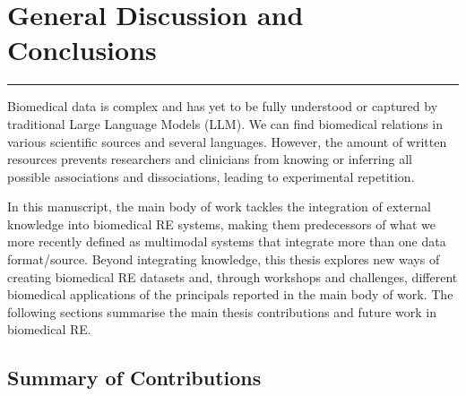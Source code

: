 \hypertarget{8}{}


\chapter[General Discussion and Conclusions]
{\huge General Discussion and Conclusions}

\vspace{-1.6cm}

\begingroup
\color{black}
\par\noindent\rule{\textwidth}{0.4pt}
\endgroup


Biomedical data is complex and has yet to be fully understood or captured by traditional Large Language Models (LLM). We can find biomedical relations in various scientific sources and several languages. However, the amount of written resources prevents researchers and clinicians from knowing or inferring all possible associations and dissociations, leading to experimental repetition. 

In this manuscript, the main body of work tackles the integration of external knowledge into biomedical RE systems, making them predecessors of what we more recently defined as multimodal systems that integrate more than one data format/source. Beyond integrating knowledge, this thesis explores new ways of creating biomedical RE datasets and, through workshops and challenges, different biomedical applications of the principals reported in the main body of work. The following sections summarise the main thesis contributions and future work in biomedical RE. 

\section{Summary of Contributions}

